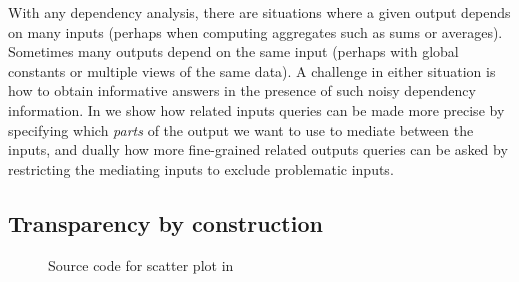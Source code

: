 With any dependency analysis, there are situations where a given output depends on many inputs (perhaps when
computing aggregates such as sums or averages). Sometimes many outputs depend on the same input (perhaps with
global constants or multiple views of the same data). A challenge in either situation is how to obtain
informative answers in the presence of such noisy dependency information. In  we show how
related inputs queries can be made more precise by specifying which \emph{parts} of the output we want to use
to mediate between the inputs, and dually how more fine-grained related outputs queries can be asked by restricting the mediating inputs to exclude problematic inputs.



\subsection{Transparency by construction}


\begin{figure}
   \small
   {}
   \caption{Source code for scatter plot in }
   \label{fig:energy-query}
\end{figure}
